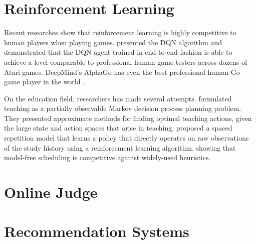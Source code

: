 \section{Reinforcement Learning}

    Recent researches show that reinforcement learning
    is highly competitive to human players when playing games.
    \textcite{mnih_human-level_2015} presented the DQN algorithm and demonstrated that
    the DQN agent trained in end-to-end fashion is able to achieve a level comparable to
    professional human game testers across dozens of Atari games.
    DeepMind's AlphaGo\cite{silver2016mastering}
    has even the best professional human Go game player in the world \cite{silver2017mastering}.

    On the education field, researchers has made several attempts.
    \textcite{rafferty2016faster} formulated teaching as a
    partially observable Markov decision process planning problem.
    They presented approximate methods for finding optimal teaching actions,
    given the large state and action spaces that arise in teaching.
    \textcite{reddy_accelerating_2017} proposed a spaced repetition model
    that learns a policy that directly operates on raw observations of the study history
    using a reinforcement learning algorithm,
    showing that model-free scheduling is competitive against widely-used heuristics.

\section{Online Judge}


\section{Recommendation Systems}

















